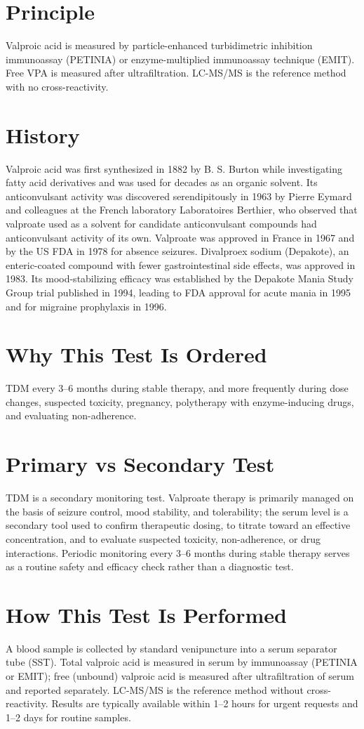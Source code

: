 \section*{Principle}
Valproic acid is measured by particle-enhanced turbidimetric inhibition immunoassay (PETINIA) or enzyme-multiplied immunoassay technique (EMIT). Free VPA is measured after ultrafiltration. LC-MS/MS is the reference method with no cross-reactivity.
\section*{History}
Valproic acid was first synthesized in 1882 by B. S. Burton while investigating fatty acid derivatives and was used for decades as an organic solvent. Its anticonvulsant activity was discovered serendipitously in 1963 by Pierre Eymard and colleagues at the French laboratory Laboratoires Berthier, who observed that valproate used as a solvent for candidate anticonvulsant compounds had anticonvulsant activity of its own. Valproate was approved in France in 1967 and by the US FDA in 1978 for absence seizures. Divalproex sodium (Depakote), an enteric-coated compound with fewer gastrointestinal side effects, was approved in 1983. Its mood-stabilizing efficacy was established by the Depakote Mania Study Group trial published in 1994, leading to FDA approval for acute mania in 1995 and for migraine prophylaxis in 1996.
\section*{Why This Test Is Ordered}
TDM every 3--6 months during stable therapy, and more frequently during dose changes, suspected toxicity, pregnancy, polytherapy with enzyme-inducing drugs, and evaluating non-adherence.
\section*{Primary vs Secondary Test}
TDM is a secondary monitoring test. Valproate therapy is primarily managed on the basis of seizure control, mood stability, and tolerability; the serum level is a secondary tool used to confirm therapeutic dosing, to titrate toward an effective concentration, and to evaluate suspected toxicity, non-adherence, or drug interactions. Periodic monitoring every 3--6 months during stable therapy serves as a routine safety and efficacy check rather than a diagnostic test.
\section*{How This Test Is Performed}
A blood sample is collected by standard venipuncture into a serum separator tube (SST). Total valproic acid is measured in serum by immunoassay (PETINIA or EMIT); free (unbound) valproic acid is measured after ultrafiltration of serum and reported separately. LC-MS/MS is the reference method without cross-reactivity. Results are typically available within 1--2 hours for urgent requests and 1--2 days for routine samples.
